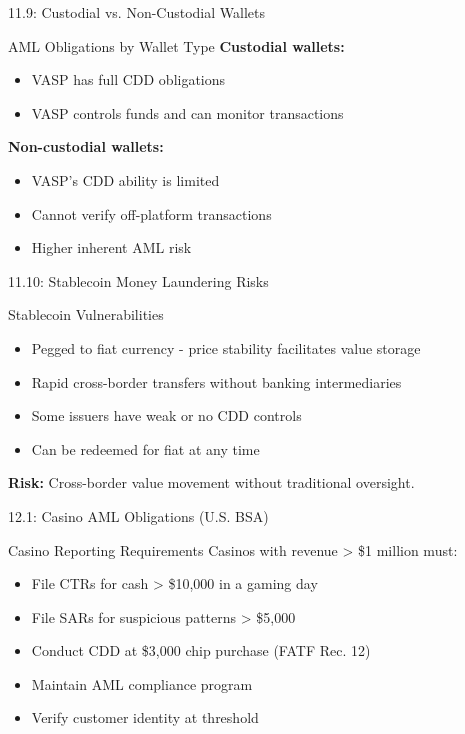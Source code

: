 \documentclass{beamer}
\begin{document}
	\begin{frame}{11.9: Custodial vs. Non-Custodial Wallets}
		\begin{block}{AML Obligations by Wallet Type}
			\textbf{Custodial wallets:}
			\begin{itemize}
				\item VASP has full CDD obligations
				\item VASP controls funds and can monitor transactions
			\end{itemize}
			\textbf{Non-custodial wallets:}
			\begin{itemize}
				\item VASP's CDD ability is limited
				\item Cannot verify off-platform transactions
				\item Higher inherent AML risk
			\end{itemize}
		\end{block}
	\end{frame}
	
	\begin{frame}{11.10: Stablecoin Money Laundering Risks}
		\begin{block}{Stablecoin Vulnerabilities}
			\begin{itemize}
				\item Pegged to fiat currency - price stability facilitates value storage
				\item Rapid cross-border transfers without banking intermediaries
				\item Some issuers have weak or no CDD controls
				\item Can be redeemed for fiat at any time
			\end{itemize}
		\end{block}
		\textbf{Risk:} Cross-border value movement without traditional oversight.
	\end{frame}
	
	
	\begin{frame}{12.1: Casino AML Obligations (U.S. BSA)}
		\begin{block}{Casino Reporting Requirements}
			Casinos with revenue > \$1 million must:
			\begin{itemize}
				\item File CTRs for cash > \$10,000 in a gaming day
				\item File SARs for suspicious patterns > \$5,000
				\item Conduct CDD at \$3,000 chip purchase (FATF Rec. 12)
				\item Maintain AML compliance program
				\item Verify customer identity at threshold
			\end{itemize}
		\end{block}
	\end{frame}
	
\end{document}
